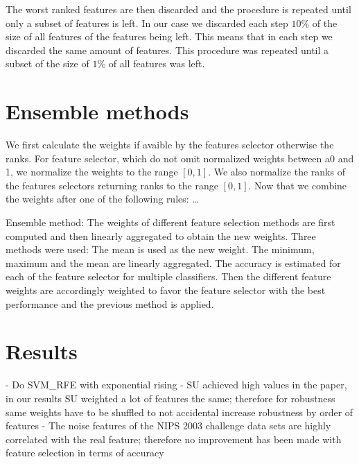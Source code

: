\documentclass[twoside,11pt]{article}
\begin{document}
The worst ranked features are then discarded and the procedure is repeated until only a subset of features is left.
In our case we discarded each step $10\%$ of the size of all features of the features being left. This means that
in each step we discarded the same amount of features. This procedure was repeated until a subset of the size
of $1\%$ of all features was left.

\section{Ensemble methods}
We first calculate the weights if avaible by the features selector otherwise the ranks.
For feature selector, which do not omit normalized weights between a0 and 1, we normalize
the weights to the range $[0,1]$. We also normalize the ranks of the features selectors returning
ranks to the range $[0,1]$. Now that we combine the weights after one of the following rules: \ldots

Ensemble method: The weights of different feature selection methods are first computed and then linearly aggregated to obtain the new weights. Three methods were used:
The mean is used as the new weight.
The minimum, maximum and the mean are linearly aggregated.
The accuracy is estimated for each of the feature selector for multiple classifiers. Then the different feature weights are accordingly weighted to favor the feature selector with the best performance and the previous method is applied.


\section{Results}
- Do SVM\_RFE with exponential rising
- SU achieved high values in the paper, in our results SU weighted a lot of features the 
same; therefore for robustness same weights have to be shuffled to not accidental increase
robustness by order of features
- The noise features of the NIPS 2003 challenge data sets are highly correlated with the
real feature; therefore no improvement has been made with feature selection in terms of 
accuracy



\newpage

\appendix


\vskip 0.2in

\end{document}
